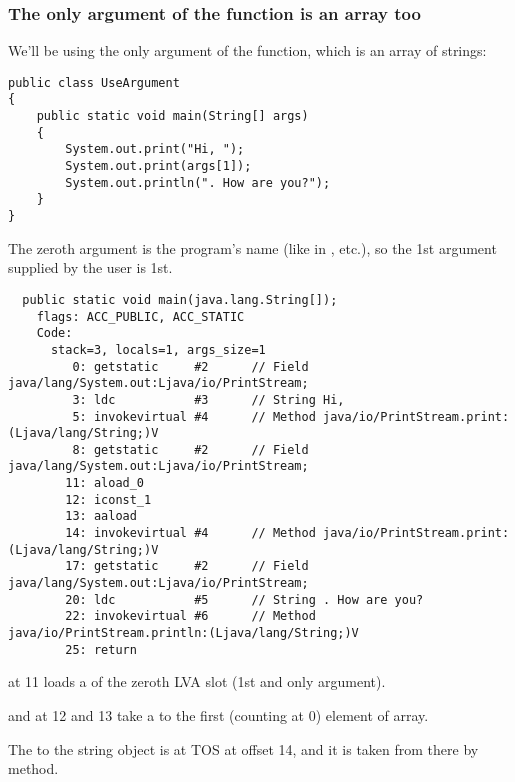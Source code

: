 \subsubsection{The only argument of the \main function is an array too}

We'll be using the only argument of the \main function, which is an array of strings:


\begin{lstlisting}[style=customjava]
public class UseArgument
{
	public static void main(String[] args)
	{
		System.out.print("Hi, ");
		System.out.print(args[1]);
		System.out.println(". How are you?");
	}
}
\end{lstlisting}

The zeroth argument is the program's name (like in \CCpp, etc.), 
so the 1st argument supplied by the user is 1st.


\begin{lstlisting}
  public static void main(java.lang.String[]);
    flags: ACC_PUBLIC, ACC_STATIC
    Code:
      stack=3, locals=1, args_size=1
         0: getstatic     #2      // Field java/lang/System.out:Ljava/io/PrintStream;
         3: ldc           #3      // String Hi, 
         5: invokevirtual #4      // Method java/io/PrintStream.print:(Ljava/lang/String;)V
         8: getstatic     #2      // Field java/lang/System.out:Ljava/io/PrintStream;
        11: aload_0       
        12: iconst_1      
        13: aaload        
        14: invokevirtual #4      // Method java/io/PrintStream.print:(Ljava/lang/String;)V
        17: getstatic     #2      // Field java/lang/System.out:Ljava/io/PrintStream;
        20: ldc           #5      // String . How are you?
        22: invokevirtual #6      // Method java/io/PrintStream.println:(Ljava/lang/String;)V
        25: return        
\end{lstlisting}

 at 11 loads a  of the zeroth \ac{LVA} slot 
(1st and only \main argument).

 and  at 12 and 13 take a  to the first (counting at 0) 
element of array.

The  to the string object is at \ac{TOS} at offset 14, and it is 
taken from there by  method.

